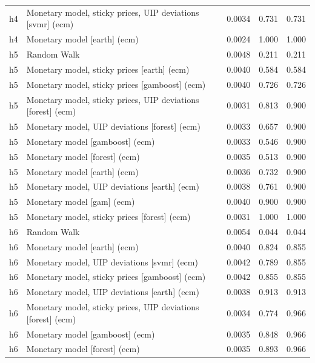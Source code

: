\begin{ThreePartTable}
\begin{longtable}[t]{cp{5.5cm}ccc}
h4 & \raggedright Monetary model, sticky prices, UIP deviations [svmr] (ecm) & 0.0034 & 0.731 & 0.731\\
h4 & \raggedright Monetary model [earth] (ecm) & 0.0024 & 1.000 & 1.000\\
\addlinespace
h5 & \raggedright Random Walk & 0.0048 & 0.211 & 0.211\\
h5 & \raggedright Monetary model, sticky prices [earth] (ecm) & 0.0040 & 0.584 & 0.584\\
h5 & \raggedright Monetary model, sticky prices [gamboost] (ecm) & 0.0040 & 0.726 & 0.726\\
h5 & \raggedright Monetary model, sticky prices, UIP deviations [forest] (ecm) & 0.0031 & 0.813 & 0.900\\
h5 & \raggedright Monetary model, UIP deviations [forest] (ecm) & 0.0033 & 0.657 & 0.900\\
h5 & \raggedright Monetary model [gamboost] (ecm) & 0.0033 & 0.546 & 0.900\\
h5 & \raggedright Monetary model [forest] (ecm) & 0.0035 & 0.513 & 0.900\\
h5 & \raggedright Monetary model [earth] (ecm) & 0.0036 & 0.732 & 0.900\\
h5 & \raggedright Monetary model, UIP deviations [earth] (ecm) & 0.0038 & 0.761 & 0.900\\
h5 & \raggedright Monetary model [gam] (ecm) & 0.0040 & 0.900 & 0.900\\
h5 & \raggedright Monetary model, sticky prices [forest] (ecm) & 0.0031 & 1.000 & 1.000\\
\addlinespace
h6 & \raggedright Random Walk & 0.0054 & 0.044 & 0.044\\
h6 & \raggedright Monetary model [earth] (ecm) & 0.0040 & 0.824 & 0.855\\
h6 & \raggedright Monetary model, UIP deviations [svmr] (ecm) & 0.0042 & 0.789 & 0.855\\
h6 & \raggedright Monetary model, sticky prices [gamboost] (ecm) & 0.0042 & 0.855 & 0.855\\
h6 & \raggedright Monetary model, UIP deviations [earth] (ecm) & 0.0038 & 0.913 & 0.913\\
h6 & \raggedright Monetary model, sticky prices, UIP deviations [forest] (ecm) & 0.0034 & 0.774 & 0.966\\
h6 & \raggedright Monetary model [gamboost] (ecm) & 0.0035 & 0.848 & 0.966\\
h6 & \raggedright Monetary model [forest] (ecm) & 0.0035 & 0.893 & 0.966\\

\end{longtable}
\end{ThreePartTable}
